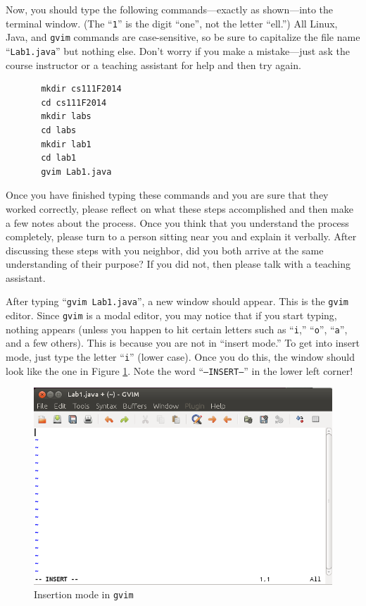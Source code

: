 Now, you should type the following commands---exactly as shown---into the terminal window.  (The ``{\tt 1}'' is the
  digit ``one'', not the letter ``ell.'') All Linux, Java, and {\tt gvim} commands are case-sensitive, so be sure to
capitalize the file name ``{\tt Lab1.java}'' but nothing else.  Don't worry if you make a mistake---just ask the course
instructor or a teaching assistant for help and then try again.

\begin{verbatim}
       mkdir cs111F2014
       cd cs111F2014
       mkdir labs
       cd labs
       mkdir lab1
       cd lab1
       gvim Lab1.java
\end{verbatim}

Once you have finished typing these commands and you are sure that they worked correctly, please reflect on what these
steps accomplished and then make a few notes about the process.  Once you think that you understand the process
completely, please turn to a person sitting near you and explain it verbally.  After discussing these steps with you
neighbor, did you both arrive at the same understanding of their purpose? If you did not, then please talk with a teaching
assistant. 

After typing ``{\tt gvim Lab1.java}'', a new window should appear. This is the {\tt gvim} editor.  Since {\tt gvim} is a
modal editor, you may notice that if you start typing, nothing appears (unless you happen to hit certain letters such as
  ``{\tt i},'' ``{\tt o}'', ``{\tt a}'', and a few others). This is because you are not in ``insert mode.'' To get into
insert mode, just type the letter ``{\tt i}'' (lower case). Once you do this, the window should look like the one in
Figure \ref{gvim-insert}. Note the word ``{\tt --INSERT--}'' in the lower left corner!

\begin{figure}[htbp]
  \centering
  \includegraphics[width=4.5in]{images/gvim-insert}
  \caption{Insertion mode in {\tt gvim}}
  \label{gvim-insert}
\end{figure}


